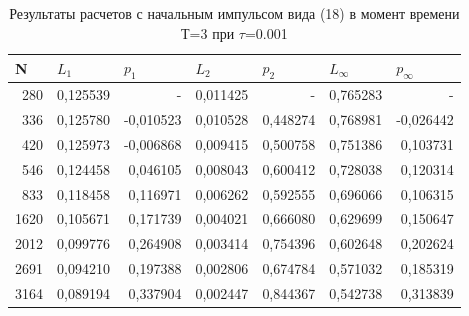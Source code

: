 \documentclass[14pt]{article}
\begin{document}
\begin{table}[H]
\caption{Результаты расчетов с начальным импульсом вида (18) в момент времени Т=3 при $\tau$=0.001}
\begin{tabular}{|r|r|r|r|r|r|r|}
\hline
\multicolumn{1}{|l|}{N} & \multicolumn{1}{l|}{$L_1$}        & \multicolumn{1}{l|}{$p_1$} & \multicolumn{1}{l|}{$L_2$}     & \multicolumn{1}{l|}{$p_2$} & \multicolumn{1}{l|}{$L_\infty$} & \multicolumn{1}{l|}{$p_\infty$} \\ \hline
280                     & 0,125539                      & -                         & 0,011425                      & -    & 0,765283                    & -                           \\ \hline
336                     & 0,125780                      & -0,010523                 & 0,010528                      & 0,448274                  & 0,768981                    & -0,026442                   \\ \hline
420                     & 0,125973                      & -0,006868                 & 0,009415                      & 0,500758                  & 0,751386                    & 0,103731                    \\ \hline
546                     & 0,124458                      & 0,046105                  & 0,008043                      & 0,600412                  & 0,728038                    & 0,120314                    \\ \hline
833                     & 0,118458                      & 0,116971                  & 0,006262                      & 0,592555                  & 0,696066                    & 0,106315                    \\ \hline
1620                    & 0,105671                      & 0,171739                  & 0,004021                      & 0,666080                  & 0,629699                    & 0,150647                    \\ \hline
2012                    & 0,099776                      & 0,264908                  & 0,003414                      & 0,754396                  & 0,602648                    & 0,202624                    \\ \hline
2691                    & 0,094210                      & 0,197388                  & 0,002806                      & 0,674784                  & 0,571032                    & 0,185319                    \\ \hline
3164                    & 0,089194                      & 0,337904                  & 0,002447                      & 0,844367                  & 0,542738                    & 0,313839                    \\ \hline

\end{tabular}
\end{table}
\end{document}
